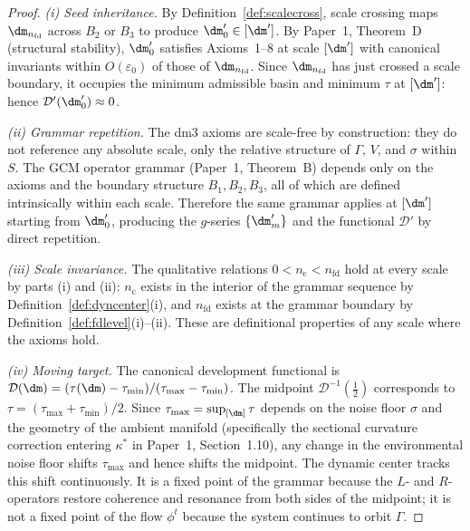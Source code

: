 \begin{proof}
\textit{(i) Seed inheritance.}
By Definition~\ref{def:scalecross}, scale crossing maps
$\dm_{n_{\mathrm{fd}}}$ across $B_2$ or $B_3$ to produce
$\dm'_0 \in [\dm']$. By Paper~1, Theorem~D (structural stability),
$\dm'_0$ satisfies Axioms~1--8 at scale $[\dm']$ with canonical
invariants within $O(\varepsilon_0)$ of those of
$\dm_{n_{\mathrm{fd}}}$. Since $\dm_{n_{\mathrm{fd}}}$ has just
crossed a scale boundary, it occupies the minimum admissible basin
and minimum $\tau$ at $[\dm']$: hence
$\mathcal{D}'(\dm'_0) \approx 0$.

\textit{(ii) Grammar repetition.}
The dm3 axioms are scale-free by construction: they do not reference
any absolute scale, only the relative structure of $\Gamma$, $V$, and
$\sigma$ within $S$. The GCM operator grammar (Paper~1, Theorem~B)
depends only on the axioms and the boundary structure
$B_1, B_2, B_3$, all of which are defined intrinsically within each
scale. Therefore the same grammar applies at $[\dm']$ starting from
$\dm'_0$, producing the $g$-series $\{\dm'_m\}$ and the functional
$\mathcal{D}'$ by direct repetition.

\textit{(iii) Scale invariance.}
The qualitative relations $0 < n_{\mathrm{c}} < n_{\mathrm{fd}}$ hold
at every scale by parts (i) and (ii): $n_{\mathrm{c}}$ exists in the
interior of the grammar sequence by Definition~\ref{def:dyncenter}(i),
and $n_{\mathrm{fd}}$ exists at the grammar boundary by
Definition~\ref{def:fdlevel}(i)--(ii). These are definitional
properties of any scale where the axioms hold.

\textit{(iv) Moving target.}
The canonical development functional is
$\mathcal{D}(\dm) = (\tau(\dm) - \tau_{\min})/
(\tau_{\max} - \tau_{\min})$. The midpoint
$\mathcal{D}^{-1}(\tfrac{1}{2})$ corresponds to
$\tau = (\tau_{\max} + \tau_{\min})/2$. Since $\tau_{\max} =
\sup_{[\dm]} \tau$ depends on the noise floor $\sigma$ and the
geometry of the ambient manifold (specifically the sectional
curvature correction entering $\kappa^*$ in Paper~1,
Section~1.10), any change in the environmental noise floor shifts
$\tau_{\max}$ and hence shifts the midpoint. The dynamic center
tracks this shift continuously. It is a fixed point of the grammar
because the $L$- and $R$-operators restore coherence and resonance
from both sides of the midpoint; it is not a fixed point of the
flow $\phi^t$ because the system continues to orbit $\Gamma$.
\end{proof}

